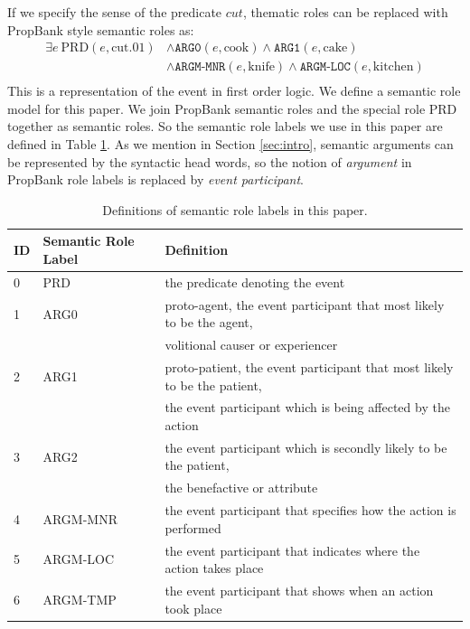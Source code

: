 \documentclass[a4paper]{article}
\begin{document}
If we specify the sense of the predicate $cut$, thematic roles can be replaced with PropBank style semantic roles as: 
\begin{equation*} \label{eg:symbolic-semantic}
\begin{aligned}
    \exists e\ \text{PRD}(e, \text{cut.01})
    & \land \texttt{ARG0}(e, \text{cook}) \land \texttt{ARG1}(e, \text{cake}) \\
    & \land \texttt{ARGM-MNR}(e, \text{knife}) \land \texttt{ARGM-LOC}(e, \text{kitchen}) \\
\end{aligned}
\end{equation*}
This is a representation of the event in first order logic. We define a semantic role model for this paper. We join PropBank semantic roles and the special role PRD together as semantic roles. So the semantic role labels we use in this paper are defined in Table \ref{tab:semantic}. As we mention in Section \ref{sec:intro}, semantic arguments can be represented by the syntactic head words, so the notion of \textit{argument} in PropBank role labels is replaced by \textit{event participant}. 
% 
% 

\begin{table}[t]
\centering
\begin{tabular}{l|l|l} 
\hline
\textbf{ID} &   \textbf{Semantic Role Label}    &   \textbf{Definition} \\  \hline
0           & PRD       &   the predicate denoting the event \\ \hline
1           & ARG0      &   proto-agent, the event participant that most likely to be the agent, \\     &&   volitional causer or experiencer \\ \hline
2           & ARG1      &   proto-patient, the event participant that most likely to be the patient, \\ &&   the event participant which is being affected by the action \\ \hline
3           & ARG2      &   the event participant which is secondly likely to be the patient,  \\       &&   the benefactive or attribute \\ \hline
4           & ARGM-MNR  &   the event participant that specifies how the action is performed \\ \hline
5           & ARGM-LOC  &   the event participant that indicates where the action takes place \\ \hline
6           & ARGM-TMP  &   the event participant that shows when an action took place \\ \hline
\end{tabular}
\caption{\label{tab:semantic} Definitions of semantic role labels in this paper.}
\end{table}
\end{document}
